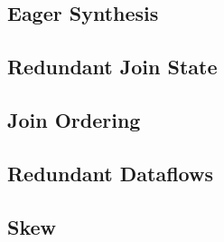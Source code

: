 \documentclass[../index.tex]{subfiles}
\begin{document}
\subsection{Eager Synthesis} \label{case-eagerness}


\subsection{Redundant Join State} \label{case-join-state}


\subsection{Join Ordering} \label{case-join-ordering}


\subsection{Redundant Dataflows} \label{case-redundant-dataflows}


\subsection{Skew} \label{case-skew}
\end{document}
